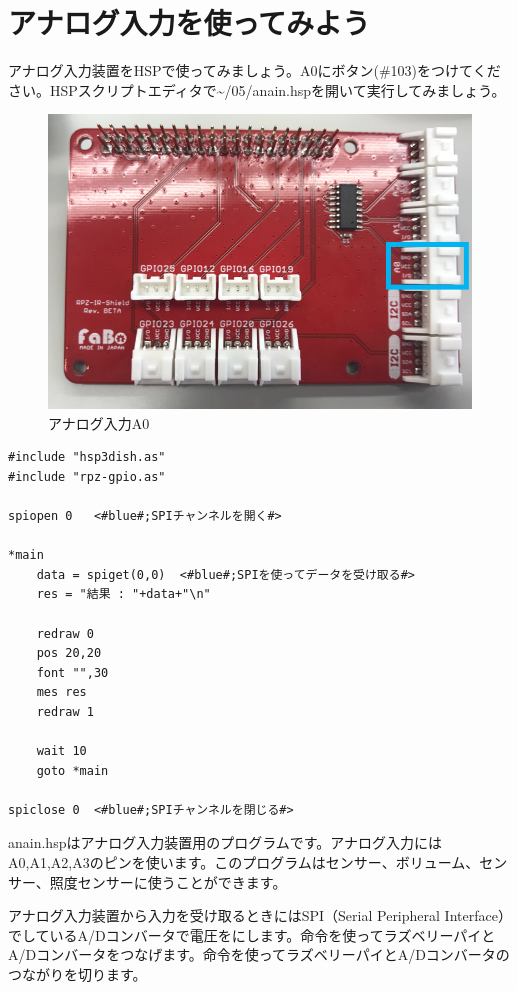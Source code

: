 \newpage
\section{アナログ入力を使ってみよう}
アナログ入力装置をHSPで使ってみましょう。A0にボタン(\#103)をつけてください。HSPスクリプトエディタで\textasciitilde /05/anain.hspを開いて実行してみましょう。\\

\begin{figure}[H]
    \centering
    \includegraphics[scale=0.6]{images/chap05/text05-img030.png}
    \caption{アナログ入力A0}
\end{figure}

\begin{lstlisting}[caption=anain.hsp,label=anain.hsp]
#include "hsp3dish.as"
#include "rpz-gpio.as"

spiopen 0	<#blue#;SPIチャンネルを開く#>

*main
	data = spiget(0,0)	<#blue#;SPIを使ってデータを受け取る#>
	res = "結果 : "+data+"\n"

	redraw 0
	pos 20,20
	font "",30
	mes res
	redraw 1

	wait 10
	goto *main

spiclose 0	<#blue#;SPIチャンネルを閉じる#>
\end{lstlisting}

anain.hspはアナログ入力装置用のプログラムです。アナログ入力にはA0,A1,A2,A3のピンを使います。このプログラムはセンサー、ボリューム、センサー、照度センサーに使うことができます。

アナログ入力装置から入力を受け取るときにはSPI（Serial Peripheral Interface）でしているA/Dコンバータで電圧をにします。命令を使ってラズベリーパイとA/Dコンバータをつなげます。命令を使ってラズベリーパイとA/Dコンバータのつながりを切ります。


